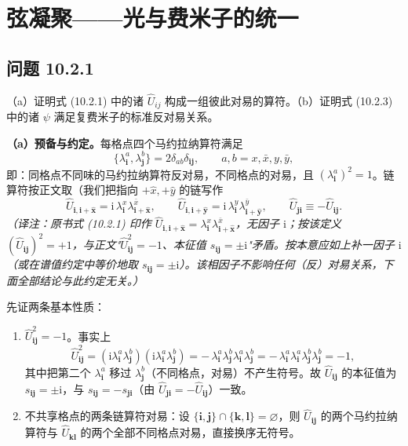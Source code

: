 \chapter{弦凝聚——光与费米子的统一}

\section*{问题 10.2.1}
\begin{problem}
（a）证明式 (10.2.1) 中的诸 $\hat U_{ij}$ 构成一组彼此对易的算符。（b）证明式 (10.2.3) 中的诸 $\psi$ 满足复费米子的标准反对易关系。
\end{problem}
\solution
\textbf{（a）预备与约定。}每格点四个马约拉纳算符满足
\begin{equation*}
\{\lambda_{\pmb{i}}^{a},\lambda_{\pmb{j}}^{b}\}=2\delta_{ab}\delta_{\pmb{i}\pmb{j}},
\qquad a,b=x,\bar{x},y,\bar{y},
\end{equation*}
即：同格点不同味的马约拉纳算符反对易，不同格点的对易，且 $(\lambda_{\pmb{i}}^{a})^2=1$。链算符按正文取（我们把指向 $+\hat{x},+\hat{y}$ 的链写作
\begin{equation*}
\hat U_{\pmb{i},\pmb{i}+\hat{\pmb{x}}}=\mathrm{i}\,\lambda_{\pmb{i}}^{x}\lambda_{\pmb{i}+\hat{\pmb{x}}}^{\bar{x}},\qquad
\hat U_{\pmb{i},\pmb{i}+\hat{\pmb{y}}}=\mathrm{i}\,\lambda_{\pmb{i}}^{y}\lambda_{\pmb{i}+\hat{\pmb{y}}}^{\bar{y}},\qquad
\hat U_{\pmb{j}\pmb{i}}\equiv-\hat U_{\pmb{i}\pmb{j}} .
\end{equation*}
\emph{（译注：原书式 (10.2.1) 印作 $\hat U_{\pmb{i},\pmb{i}+\hat{\pmb x}}=\lambda_{\pmb i}^{x}\lambda_{\pmb{i+\hat x}}^{\bar x}$，无因子 $\mathrm{i}$；按该定义 $(\hat U_{\pmb{ij}})^2=+1$，与正文"$\hat U_{\pmb{ij}}^2=-1$、本征值 $s_{\pmb{ij}}=\pm\mathrm{i}$"矛盾。按本意应如上补一因子 $\mathrm{i}$（或在谱值约定中等价地取 $s_{\pmb{ij}}=\pm\mathrm{i}$）。该相因子不影响任何（反）对易关系，下面全部结论与此约定无关。）}

先证两条基本性质：
\begin{enumerate}
\item[(i)] $\hat U_{\pmb{ij}}^2=-1$。事实上
\begin{equation*}
\hat U_{\pmb{ij}}^2=(\mathrm{i}\lambda_{\pmb{i}}^{a}\lambda_{\pmb{j}}^{b})(\mathrm{i}\lambda_{\pmb{i}}^{a}\lambda_{\pmb{j}}^{b})
=-\,\lambda_{\pmb{i}}^{a}\lambda_{\pmb{j}}^{b}\lambda_{\pmb{i}}^{a}\lambda_{\pmb{j}}^{b}
=-\,\lambda_{\pmb{i}}^{a}\lambda_{\pmb{i}}^{a}\lambda_{\pmb{j}}^{b}\lambda_{\pmb{j}}^{b}=-1,
\end{equation*}
其中把第二个 $\lambda_{\pmb{i}}^{a}$ 移过 $\lambda_{\pmb{j}}^{b}$（不同格点，对易）不产生符号。故 $\hat U_{\pmb{ij}}$ 的本征值为 $s_{\pmb{ij}}=\pm\mathrm{i}$，与 $s_{\pmb{ij}}=-s_{\pmb{ji}}$（由 $\hat U_{\pmb{ji}}=-\hat U_{\pmb{ij}}$）一致。
\item[(ii)] 不共享格点的两条链算符对易：设 $\{\pmb{i},\pmb{j}\}\cap\{\pmb{k},\pmb{l}\}=\varnothing$，则 $\hat U_{\pmb{ij}}$ 的两个马约拉纳算符与 $\hat U_{\pmb{kl}}$ 的两个全部不同格点对易，直接换序无符号。
\end{enumerate}

